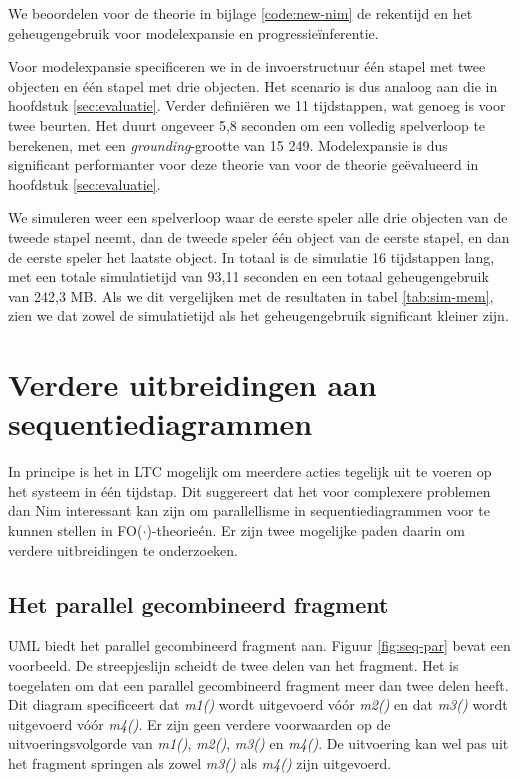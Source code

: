 We beoordelen voor de theorie in bijlage \ref{code:new-nim} de rekentijd en het geheugengebruik voor modelexpansie en progressie\"inferentie.

Voor modelexpansie specificeren we in de invoerstructuur \'e\'en stapel met twee objecten en \'e\'en stapel met drie objecten. Het scenario is dus analoog aan die in hoofdstuk \ref{sec:evaluatie}. Verder defini\"eren we 11 tijdstappen, wat genoeg is voor twee beurten. Het duurt ongeveer 5,8 seconden om een volledig spelverloop te berekenen, met een \textit{grounding}-grootte van 15 249. Modelexpansie is dus significant performanter voor deze theorie van voor de theorie ge\"evalueerd in hoofdstuk \ref{sec:evaluatie}.

We simuleren weer een spelverloop waar de eerste speler alle drie objecten van de tweede stapel neemt, dan de tweede speler \'e\'en object van de eerste stapel, en dan de eerste speler het laatste object. In totaal is de simulatie 16 tijdstappen lang, met een totale simulatietijd van 93,11 seconden en een totaal geheugengebruik van 242,3 MB. Als we dit vergelijken met de resultaten in tabel \ref{tab:sim-mem}, zien we dat zowel de simulatietijd als het geheugengebruik significant kleiner zijn.

\section{Verdere uitbreidingen aan sequentiediagrammen}

In principe is het in LTC mogelijk om meerdere acties tegelijk uit te voeren op het systeem in \'e\'en tijdstap. Dit suggereert dat het voor complexere problemen dan Nim interessant kan zijn om parallellisme in sequentiediagrammen voor te kunnen stellen in FO($\cdot$)-theorie\'en. Er zijn twee mogelijke paden daarin om verdere uitbreidingen te onderzoeken.

\subsection{Het parallel gecombineerd fragment}

UML biedt het parallel gecombineerd fragment aan. Figuur \ref{fig:seq-par} bevat een voorbeeld. De streepjeslijn scheidt de twee delen van het fragment. Het is toegelaten om dat een parallel gecombineerd fragment meer dan twee delen heeft. Dit diagram specificeert dat \textit{m1()} wordt uitgevoerd v\'o\'or \textit{m2()} en dat \textit{m3()} wordt uitgevoerd v\'o\'or \textit{m4()}. Er zijn geen verdere voorwaarden op de uitvoeringsvolgorde van \textit{m1()}, \textit{m2()}, \textit{m3()} en \textit{m4()}. De uitvoering kan wel pas uit het fragment springen als zowel \textit{m3()} als \textit{m4()} zijn uitgevoerd.

